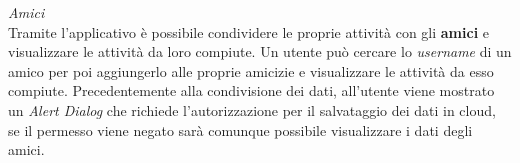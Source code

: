 \documentclass{article}
\begin{document}
\begin{center}
    \begin{figure}[h]
        \centering
    \end{figure}
\end{center}
\textit{Amici} \\
Tramite l'applicativo è possibile condividere le proprie attività con gli \textbf{amici} e visualizzare le attività da loro compiute. Un utente può cercare lo \textit{username} di un amico per poi aggiungerlo alle proprie amicizie e visualizzare le attività da esso compiute.
Precedentemente alla condivisione dei dati, all'utente viene mostrato un \textit{Alert Dialog} che richiede l'autorizzazione per il salvataggio dei dati in cloud, se il permesso viene negato sarà comunque possibile visualizzare i dati degli amici.
\end{document}

